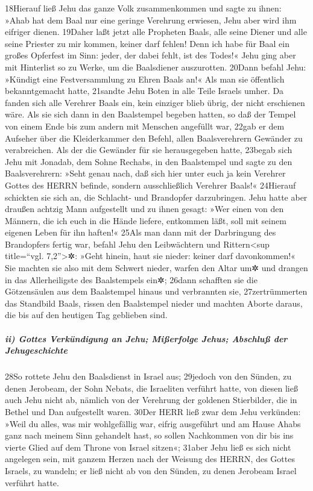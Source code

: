 18Hierauf ließ Jehu das ganze Volk zusammenkommen und sagte zu ihnen:
»Ahab hat dem Baal nur eine geringe Verehrung erwiesen, Jehu aber wird
ihm eifriger dienen. 19Daher laßt jetzt alle Propheten Baals, alle seine
Diener und alle seine Priester zu mir kommen, keiner darf fehlen! Denn
ich habe für Baal ein großes Opferfest im Sinn: jeder, der dabei fehlt,
ist des Todes!« Jehu ging aber mit Hinterlist so zu Werke, um die
Baalsdiener auszurotten. 20Dann befahl Jehu: »Kündigt eine
Festversammlung zu Ehren Baals an!« Als man sie öffentlich
bekanntgemacht hatte, 21sandte Jehu Boten in alle Teile Israels umher.
Da fanden sich alle Verehrer Baals ein, kein einziger blieb übrig, der
nicht erschienen wäre. Als sie sich dann in den Baalstempel begeben
hatten, so daß der Tempel von einem Ende bis zum andern mit Menschen
angefüllt war, 22gab er dem Aufseher über die Kleiderkammer den Befehl,
allen Baalsverehrern Gewänder zu verabreichen. Als der die Gewänder für
sie herausgegeben hatte, 23begab sich Jehu mit Jonadab, dem Sohne
Rechabs, in den Baalstempel und sagte zu den Baalsverehrern: »Seht genau
nach, daß sich hier unter euch ja kein Verehrer Gottes des HERRN
befinde, sondern ausschließlich Verehrer Baals!« 24Hierauf schickten sie
sich an, die Schlacht- und Brandopfer darzubringen. Jehu hatte aber
draußen achtzig Mann aufgestellt und zu ihnen gesagt: »Wer einen von den
Männern, die ich euch in die Hände liefere, entkommen läßt, soll mit
seinem eigenen Leben für ihn haften!« 25Als man dann mit der Darbringung
des Brandopfers fertig war, befahl Jehu den Leibwächtern und
Rittern\textless sup title=``vgl. 7,2''\textgreater✲: »Geht hinein, haut
sie nieder: keiner darf davonkommen!« Sie machten sie also mit dem
Schwert nieder, warfen den Altar um✲ und drangen in das Allerheiligste
des Baalstempels ein✲; 26dann schafften sie die Götzensäulen aus dem
Baalstempel hinaus und verbrannten sie, 27zertrümmerten das Standbild
Baals, rissen den Baalstempel nieder und machten Aborte daraus, die bis
auf den heutigen Tag geblieben sind.

\hypertarget{ii-gottes-verkuxfcndigung-an-jehu-miuxdferfolge-jehus-abschluuxdf-der-jehugeschichte}{%
\subparagraph{ii) Gottes Verkündigung an Jehu; Mißerfolge Jehus;
Abschluß der
Jehugeschichte}\label{ii-gottes-verkuxfcndigung-an-jehu-miuxdferfolge-jehus-abschluuxdf-der-jehugeschichte}}

28So rottete Jehu den Baalsdienst in Israel aus; 29jedoch von den
Sünden, zu denen Jerobeam, der Sohn Nebats, die Israeliten verführt
hatte, von diesen ließ auch Jehu nicht ab, nämlich von der Verehrung der
goldenen Stierbilder, die in Bethel und Dan aufgestellt waren. 30Der
HERR ließ zwar dem Jehu verkünden: »Weil du alles, was mir wohlgefällig
war, eifrig ausgeführt und am Hause Ahabs ganz nach meinem Sinn
gehandelt hast, so sollen Nachkommen von dir bis ins vierte Glied auf
dem Throne von Israel sitzen«; 31aber Jehu ließ es sich nicht angelegen
sein, mit ganzem Herzen nach der Weisung des HERRN, des Gottes Israels,
zu wandeln; er ließ nicht ab von den Sünden, zu denen Jerobeam Israel
verführt hatte.

